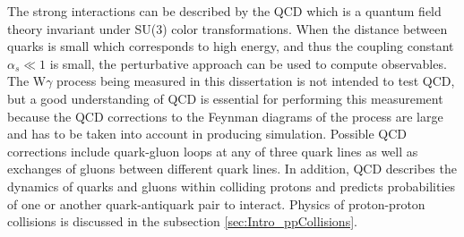 The strong interactions can be described by the QCD which is a quantum field theory invariant under SU(3) color transformations. When the distance between quarks is small which corresponds to high energy, and thus the coupling constant $\alpha_s \ll 1$ is small, the perturbative approach can be used to compute observables.\\

The W$\gamma$ process being measured in this dissertation is not intended to test QCD, but a good understanding of QCD is essential for performing this measurement because the QCD corrections to the Feynman diagrams of the process are large and has to be taken into account in producing simulation. Possible QCD corrections include quark-gluon loops at any of three quark lines as well as exchanges of gluons between different quark lines. In addition, QCD describes the dynamics of quarks and gluons within colliding protons and predicts probabilities of one or another quark-antiquark pair to interact. Physics of proton-proton collisions is discussed in the subsection \ref{sec:Intro_ppCollisions}. \\
 
